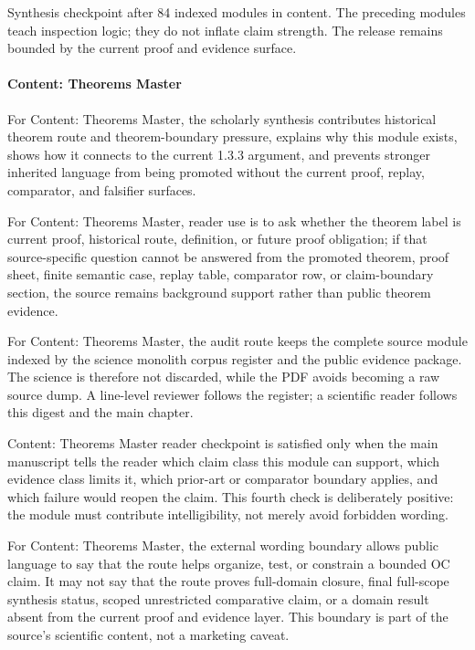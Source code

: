 Synthesis checkpoint after 84 indexed modules in content. The preceding modules teach inspection logic; they do not inflate claim strength. The release remains bounded by the current proof and evidence surface.


\paragraph{Content: Theorems Master}

For Content: Theorems Master, the scholarly synthesis contributes historical theorem route and theorem-boundary pressure, explains why this module exists, shows how it connects to the current 1.3.3 argument, and prevents stronger inherited language from being promoted without the current proof, replay, comparator, and falsifier surfaces.


For Content: Theorems Master, reader use is to ask whether the theorem label is current proof, historical route, definition, or future proof obligation; if that source-specific question cannot be answered from the promoted theorem, proof sheet, finite semantic case, replay table, comparator row, or claim-boundary section, the source remains background support rather than public theorem evidence.


For Content: Theorems Master, the audit route keeps the complete source module indexed by the science monolith corpus register and the public evidence package. The science is therefore not discarded, while the PDF avoids becoming a raw source dump. A line-level reviewer follows the register; a scientific reader follows this digest and the main chapter.


Content: Theorems Master reader checkpoint is satisfied only when the main manuscript tells the reader which claim class this module can support, which evidence class limits it, which prior-art or comparator boundary applies, and which failure would reopen the claim. This fourth check is deliberately positive: the module must contribute intelligibility, not merely avoid forbidden wording.


For Content: Theorems Master, the external wording boundary allows public language to say that the route helps organize, test, or constrain a bounded OC claim. It may not say that the route proves full-domain closure, final full-scope synthesis status, scoped unrestricted comparative claim, or a domain result absent from the current proof and evidence layer. This boundary is part of the source's scientific content, not a marketing caveat.


